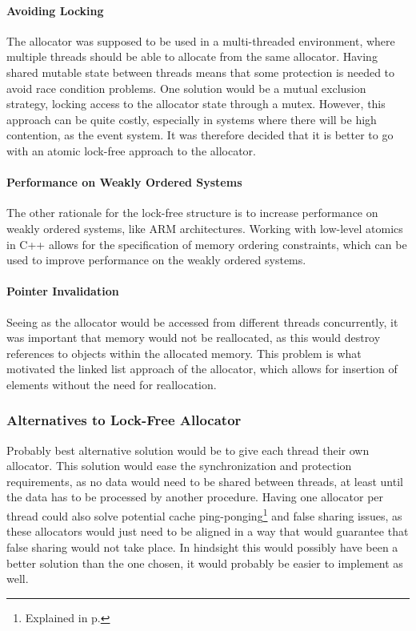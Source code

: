 \paragraph{Avoiding Locking}
The allocator was supposed to be used in a multi-threaded environment, where multiple threads
should be able to allocate from the same allocator.
Having shared mutable state between threads means that some protection is needed
to avoid race condition problems.
One solution would be a mutual exclusion strategy, locking access to the allocator state through a mutex.
However, this approach can be quite costly, especially in systems where there will be high contention, as the event system.
It was therefore decided that it is better to go with an atomic lock-free approach to the allocator.

\paragraph{Performance on Weakly Ordered Systems}
The other rationale for the lock-free structure is to increase performance on weakly ordered systems, like ARM architectures\cite{preshing_weak_vs_strong_memory_models}.
Working with low-level atomics in C++ allows for the specification of memory ordering constraints, which can be used to improve performance on the weakly ordered systems.

\paragraph{Pointer Invalidation}
Seeing as the allocator would be accessed from different threads concurrently, it was important that memory would not be reallocated, as this would destroy references to objects within the allocated memory.
This problem is what motivated the linked list approach of the allocator, which allows for insertion of elements without the need for reallocation.

\subsubsection{Alternatives to Lock-Free Allocator}
\label{subsubsec:lock_free_allocator_alternatives}
Probably best alternative solution would be to give each thread their own allocator.
This solution would ease the synchronization and protection requirements, as no data would need to be shared between threads, at least until the data has to be processed by another procedure.
Having one allocator per thread could also solve potential cache ping-ponging\footnote{Explained in p.\pageref{par:detailed_lock_free_ping_pong}} and false sharing issues, as these allocators would just need to be aligned in a way that would guarantee that false sharing would not take place.
In hindsight this would possibly have been a better solution than the one chosen, it would probably be easier to implement as well.

